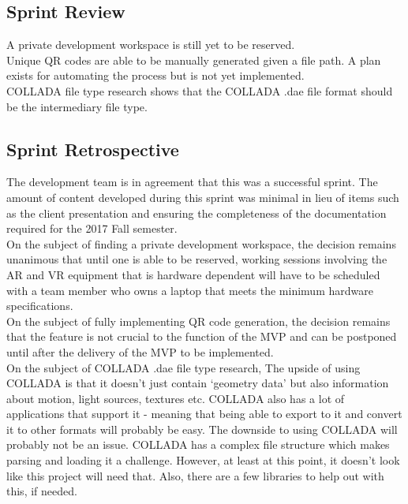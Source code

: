     \subsection{Sprint Review}
    \label{sec:Sprint5_review}
        \hspace{7mm}
        A private development workspace is still yet to be reserved.\\

        Unique QR codes are able to be manually generated given a file path.  A plan exists for automating
        the process but is not yet implemented.\\
        
        COLLADA file type research shows that the COLLADA .dae file format should be the intermediary file type.

    \subsection{Sprint Retrospective}
    \label{sec:Sprint5_retrospective}
        \hspace{7mm}
        The development team is in agreement that this was a successful sprint.  The amount of
        content developed during this sprint was minimal in lieu of items such as the client 
        presentation and ensuring the completeness of the documentation required for the 2017
        Fall semester.\\
        
        On the subject of finding a private development workspace, the decision remains unanimous that until one 
        is able to be reserved, working sessions involving the AR and VR equipment that is hardware dependent 
        will have to be scheduled with a team member who owns a laptop that meets the minimum hardware
        specifications.\\

        On the subject of fully implementing QR code generation, the decision remains that 
        the feature is not crucial to the function of the MVP and can be postponed until after the delivery
        of the MVP to be implemented.\\

        On the subject of COLLADA .dae file type research, The upside of using COLLADA is that it doesn't just 
        contain `geometry data' but also information about motion, light sources, textures etc. COLLADA also 
        has a lot of applications that support it - meaning that being able to export to it and convert it to 
        other formats will probably be easy. The downside to using COLLADA will probably not be an issue. 
        COLLADA has a complex file structure which makes parsing and loading it a challenge. However, at least 
        at this point, it doesn't look like this project will need that. Also, there are a few libraries to 
        help out with this, if needed.\\